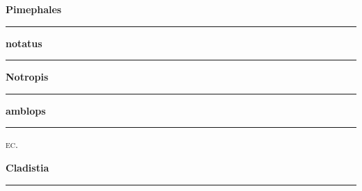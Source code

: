 \documentclass[11pt]{exam}
\newcommand*\Matching[1]{
\ifprintanswers
	\textbf{#1}
\else
	\rule{2.1in}{0.4pt}
\fi
}
\newlength\matchlena
\newlength\matchlenb
\newcommand\MatchQuestion[2]{%
	\setlength\matchlenb{\linewidth}
	\addtolength\matchlenb{-\matchlena}
	\parbox[t]{\matchlena}{\Matching{#1}}\enspace\parbox[t]{\matchlenb}{#2}}
\newlength\eclength
\newcommand*\ECQuestion[2]{%
	\setlength\matchlenb{\linewidth}
	\addtolength\matchlenb{-\eclength}
	\hspace{-0.24in}\textsc{ec}.\enspace\parbox[t]{\eclength}{\Matching{#1}}\enspace\parbox[t]{\matchlenb}{#2}}
\begin{document}
\begin{questions}
\begin{multicols}{2}
\question\MatchQuestion{Pimephales}{}
\vspace{1.5\baselineskip}

\question\MatchQuestion{notatus}{}
\vspace{1.5\baselineskip}

\question\MatchQuestion{Notropis}{}
\vspace{1.5\baselineskip}

\question\MatchQuestion{amblops}{}
\vspace{1.5\baselineskip}

\ECQuestion{Cladistia}{}
\vspace{1.5\baselineskip}

\end{multicols}

\end{questions}
\end{document}
